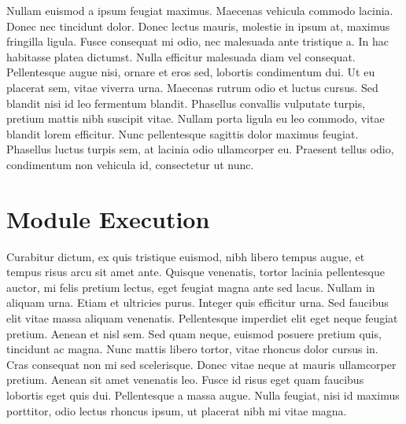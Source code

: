 Nullam euismod a ipsum feugiat maximus. Maecenas vehicula commodo lacinia. Donec nec tincidunt dolor. Donec lectus mauris, molestie in ipsum at, maximus fringilla ligula. Fusce consequat mi odio, nec malesuada ante tristique a. In hac habitasse platea dictumst. Nulla efficitur malesuada diam vel consequat. Pellentesque augue nisi, ornare et eros sed, lobortis condimentum dui. Ut eu placerat sem, vitae viverra urna. Maecenas rutrum odio et luctus cursus. Sed blandit nisi id leo fermentum blandit. Phasellus convallis vulputate turpis, pretium mattis nibh suscipit vitae. Nullam porta ligula eu leo commodo, vitae blandit lorem efficitur. Nunc pellentesque sagittis dolor maximus feugiat. Phasellus luctus turpis sem, at lacinia odio ullamcorper eu. Praesent tellus odio, condimentum non vehicula id, consectetur ut nunc.


\section{Module Execution}
Curabitur dictum, ex quis tristique euismod, nibh libero tempus augue, et tempus risus arcu sit amet ante. Quisque venenatis, tortor lacinia pellentesque auctor, mi felis pretium lectus, eget feugiat magna ante sed lacus. Nullam in aliquam urna. Etiam et ultricies purus. Integer quis efficitur urna. Sed faucibus elit vitae massa aliquam venenatis. Pellentesque imperdiet elit eget neque feugiat pretium. Aenean et nisl sem. Sed quam neque, euismod posuere pretium quis, tincidunt ac magna. Nunc mattis libero tortor, vitae rhoncus dolor cursus in. Cras consequat non mi sed scelerisque. Donec vitae neque at mauris ullamcorper pretium. Aenean sit amet venenatis leo. Fusce id risus eget quam faucibus lobortis eget quis dui. Pellentesque a massa augue. Nulla feugiat, nisi id maximus porttitor, odio lectus rhoncus ipsum, ut placerat nibh mi vitae magna.
